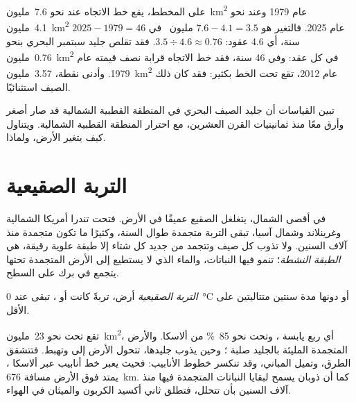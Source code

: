 \begin{example}
على المخطط، يقع خط الاتجاه عند نحو \num{7.6}~مليون~\unit{km^2} عام 1979
وعند نحو \num{4.1}~مليون~\unit{km^2} عام 2025. فالتغير هو $7.6 - 4.1 =
3.5$ مليون~ في $2025 - 1979 = 46$ سنة، أي 4.6 عقود:
$3.5 \div 4.6 \approx 0.76$. فقد تقلص جليد سبتمبر البحري بنحو
\num{0.76}~مليون~\unit{km^2} في كل عقد: وفي 46 سنة، فقد خط الاتجاه قرابة نصف
قيمته عام 1979. وأدنى نقطة، \num{3.57}~مليون~\unit{km^2} عام 2012، تقع تحت
الخط بكثير: فقد كان ذلك الصيف استثنائيًا.
\end{example}

تبين القياسات أن جليد الصيف البحري في المنطقة القطبية الشمالية قد صار أصغر
وأرق معًا منذ ثمانينيات القرن العشرين، مع احترار المنطقة القطبية الشمالية.
ويتناول  كيف يتغير  الأرض،
ولماذا.

\section{التربة الصقيعية}

في أقصى الشمال، يتغلغل الصقيع عميقًا في الأرض. فتحت تندرا أمريكا الشمالية
وغرينلاند وشمال آسيا، تبقى التربة  متجمدة طوال السنة، وكثيرًا ما تكون
متجمدة منذ آلاف السنين. ولا تذوب كل صيف وتتجمد من جديد كل شتاء إلا طبقة علوية
رقيقة، هي \emph{الطبقة النشطة}؛ تنمو فيها النباتات، والماء الذي لا يستطيع
 إلى الأرض المتجمدة تحتها يتجمع في برك على السطح.

\begin{definition}\label{def:g8:ice-on-earth:permafrost}
\emph{التربة الصقيعية} أرض، تربةً كانت أو ، تبقى عند
\qty{0}{\degreeCelsius} أو دونها مدة سنتين متتاليتين على الأقل.
\end{definition}

تقع  تحت نحو \num{23}~مليون~\unit{km^2}، أي ربع يابسة ، وتحت نحو 85~\% من ألاسكا. والأرض المتجمدة المليئة بالجليد صلبة
؛ وحين يذوب جليدها، تتحول الأرض إلى  وتهبط. فتتشقق الطرق، وتميل
المباني، وقد تنكسر خطوط الأنابيب: فحيث يعبر خط أنابيب عبر ألاسكا ، يمتد فوق الأرض مسافة \qty{676}{km}. كما أن ذوبان 
يسمح لبقايا النباتات المتجمدة فيها منذ آلاف السنين بأن تتحلل، فتطلق ثاني
أكسيد الكربون والميثان في الهواء.

